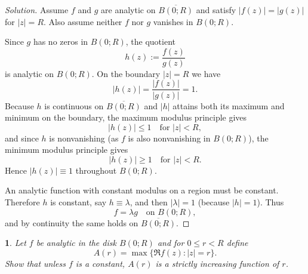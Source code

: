 \documentclass[12pt, a4paper]{report}
\theoremstyle{spaced}
\newtheorem{exercise}{}
\newcommand{\setexercise}[1]{\setcounter{exercise}{#1-1}}
\begin{document}
\begin{proof}[Solution]
	Assume $f$ and $g$ are analytic on $\overline{B(0;R)}$ and satisfy $|f(z)|=|g(z)|$ for $|z|=R$. Also assume neither $f$ nor $g$ vanishes in $B(0;R)$.

	Since $g$ has no zeros in $B(0;R)$, the quotient
	\[
		h(z):=\frac{f(z)}{g(z)}
	\]
	is analytic on $B(0;R)$. On the boundary $|z|=R$ we have
	\[
		|h(z)|=\frac{|f(z)|}{|g(z)|}=1.
	\]
	Because $h$ is continuous on $\overline{B(0;R)}$ and $|h|$ attains both its maximum and minimum on the boundary, the maximum modulus principle gives
	\[
		|h(z)|\le 1 \quad \text{for } |z|<R,
	\]
	and since $h$ is nonvanishing (as $f$ is also nonvanishing in $B(0;R)$), the minimum modulus principle gives
	\[
		|h(z)|\ge 1 \quad \text{for } |z|<R.
	\]
	Hence $|h(z)|\equiv 1$ throughout $B(0;R)$.

	An analytic function with constant modulus on a region must be constant. Therefore $h$ is constant, say $h\equiv \lambda$, and then $|\lambda|=1$ (because $|h|=1$). Thus
	\[
		f=\lambda g \quad \text{on } B(0;R),
	\]
	and by continuity the same holds on $\overline{B(0;R)}$.
\end{proof}


\setexercise{7}
\begin{exercise}
	Let $f$ be analytic in the disk $B(0;R)$ and for $0 \le r < R$ define
	\[
		A(r) = \max \{ \Re f(z) : |z| = r \}.
	\]
	Show that unless $f$ is a constant, $A(r)$ is a strictly increasing function of $r$.
\end{exercise}
\end{document}
